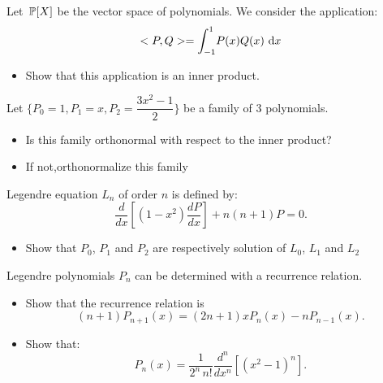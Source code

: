 \bexo
Let $\, \mathbb{P}[X]$ be the vector space of polynomials. We consider the application:
$$
<P,Q>=\displaystyle{\int_{-1}^1} P(x)Q(x)\,\,\textrm{d} x
$$
\begin{itemize}
	\item Show that this application is an inner product. 
\end{itemize}

Let $\{P_0=1,P_1=x,P_2=\dfrac{3x^2-1}{2}\}$ be a family of 3 polynomials. 


\begin{itemize}
	\item Is this family orthonormal with respect to the inner product?
	\item If not,orthonormalize this family
\end{itemize}

Legendre equation $L_n$ of order $n$ is defined by: 
\begin{equation*}
\dfrac{d}{dx}\left[
(1-x^2)\dfrac{dP}{dx}
\right]+n(n+1)P=0.
\end{equation*}


\begin{itemize}
	\item Show that $P_0$, $P_1$ and $P_2$ are respectively solution of $L_0$, $L_1$ and $L_2$
\end{itemize}

Legendre polynomials $P_n$ can be determined with a recurrence relation. 


\begin{itemize}
	\item Show that the recurrence relation is
$$
(n+1)P_{n+1}(x)=(2n+1) x P_n(x) - n P_{n-1}(x).
$$
\end{itemize}

\begin{itemize}
	\item
Show that:
$$
P_{n}(x)=\dfrac{1}{2^n\,n!}\dfrac{d^n}{dx^n}\left[
(x^2-1)^n
\right].
$$
\end{itemize}


\eexo
{}